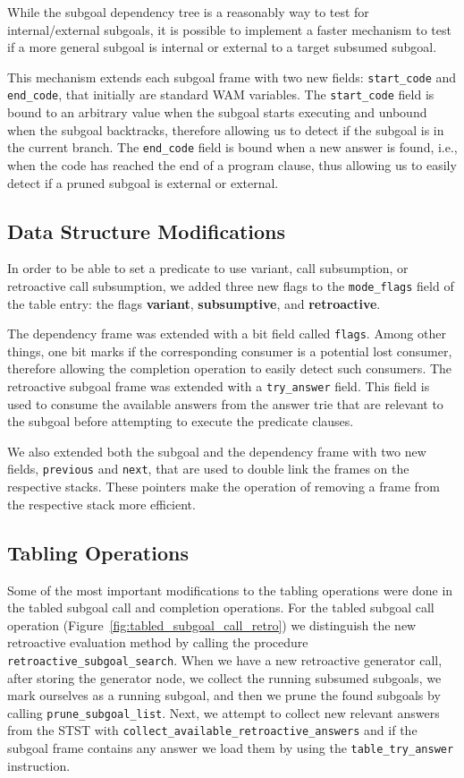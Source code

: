 While the subgoal dependency tree is a reasonably way to test for internal/external
subgoals, it is possible to implement a faster mechanism to test if a more general subgoal
is internal or external to a target subsumed subgoal.

This mechanism extends each subgoal frame with two new fields: \texttt{start\_code}
and \texttt{end\_code}, that initially are standard WAM variables.
The \texttt{start\_code} field is bound to an arbitrary value when the subgoal starts
executing and unbound when the subgoal backtracks, therefore allowing us to detect
if the subgoal is in the current branch. The \texttt{end\_code} field is bound
when a new answer is found, i.e., when the code has reached the end of a program
clause, thus allowing us to easily detect if a pruned subgoal is external or external.

\subsection{Data Structure Modifications}

In order to be able to set a predicate to use variant, call subsumption, or retroactive call
subsumption, we added three new flags to the \texttt{mode\_flags} field of the table entry: the flags
\textbf{variant}, \textbf{subsumptive}, and \textbf{retroactive}.

The dependency frame was extended with a bit field called \texttt{flags}. Among other things,
one bit marks if the corresponding consumer is a potential lost consumer, therefore allowing
the completion operation to easily detect such consumers.
The retroactive subgoal frame was extended with a \texttt{try\_answer} field. This field is used
to consume the available answers from the answer trie that are relevant to the subgoal
before attempting to execute the predicate clauses.

We also extended both the subgoal and the dependency frame with two new fields, \texttt{previous} and
\texttt{next}, that are used to double link the frames on the respective stacks. These pointers
make the operation of removing a frame from the respective stack more efficient.

\subsection{Tabling Operations}

Some of the most important modifications to the tabling operations were done in the tabled subgoal call and
completion operations. For the tabled subgoal call operation (Figure~\ref{fig:tabled_subgoal_call_retro})
we distinguish the new retroactive evaluation method by calling the procedure \texttt{retroactive\_subgoal\_search}.
When we have a new retroactive generator call, after storing the
generator node, we collect the running subsumed subgoals, we mark ourselves as a running subgoal, and
then we prune the found subgoals by calling \texttt{prune\_subgoal\_list}.
Next, we attempt to collect new relevant answers from the STST with
\texttt{collect\_available\_retroactive\_answers} and if the subgoal frame contains any answer
we load them by using the \texttt{table\_try\_answer} instruction.

